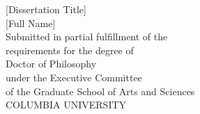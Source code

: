 
\begin{titlepage}
\begin{center}

\begin{singlespacing}
\vspace*{6\baselineskip}
[Dissertation Title]\\
\vspace{3\baselineskip}
[Full Name]\\
\vspace{18\baselineskip}
Submitted in partial fulfillment of the\\
requirements for the degree of\\
Doctor of Philosophy\\
under the Executive Committee\\
of the Graduate School of Arts and Sciences\\
\vspace{3\baselineskip}
COLUMBIA UNIVERSITY\\
\vspace{3\baselineskip}
\the\year
\vfill


\end{singlespacing}

\end{center}
\end{titlepage}


